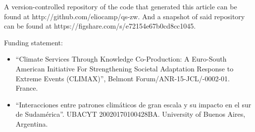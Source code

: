 \documentclass[draft,linenumbers]{agujournal2018}
\begin{document}
\acknowledgments

A version-controlled repository of the code that generated this article
can be found at http://github.com/eliocamp/qs-zw. And a snapshot of said
repository can be found at https://figshare.com/s/e72154e67b0cd8cc1045.

Funding statement:

\begin{itemize}
\item
  ``Climate Services Through Knowledge Co-Production: A Euro-South
  American Initiative For Strengthening Societal Adaptation Response to
  Extreme Events (CLIMAX)'', Belmont Forum/ANR-15-JCL/-0002-01. France.
\item
  ``Interacciones entre patrones climáticos de gran escala y su impacto
  en el sur de Sudamérica''. UBACYT 20020170100428BA. University of
  Buenos Aires, Argentina.
\end{itemize}


\end{document}
